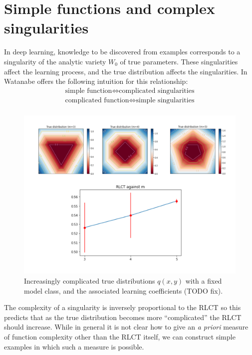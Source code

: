 \documentclass{article} %
\begin{document}
\section{Simple functions and complex singularities}\label{section:simple_func}

In deep learning, knowledge to be discovered from examples corresponds to a singularity of the analytic variety $W_0$ of true parameters. These singularities affect the learning process, and the true distribution affects the singularities. In \citep[\S 7.6]{watanabe_algebraic_2009} Watanabe offers the following intuition for this relationship:
\begin{align*}
\text{simple function} \iff \text{complicated singularities}\\
\text{complicated function} \iff \text{simple singularities}\\
\end{align*}

\begin{figure}[h]
\begin{center}
\includegraphics[scale=0.3]{RLCT_m.pdf}
\end{center}
\caption{Increasingly complicated true distributions $q(x,y)$ with a fixed model class, and the associated learning coefficients (TODO fix).}
\label{figure:simp_func_complex}
\end{figure}

The complexity of a singularity is inversely proportional to the RLCT so this predicts that as the true distribution becomes more ``complicated'' the RLCT should increase. While in general it is not clear how to give an \emph{a priori} measure of function complexity other than the RLCT itself, we can construct simple examples in which such a measure is possible.
\end{document}
